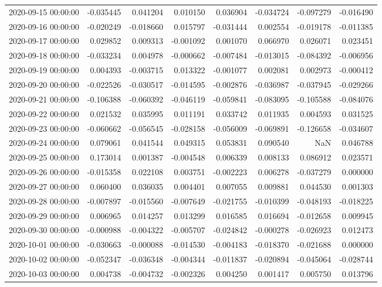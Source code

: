 \begin{tabular}{lrrrrrrr}
2020-09-15 00:00:00 & -0.035445 & 0.041204 & 0.010150 & 0.036904 & -0.034724 & -0.097279 & -0.016490 \\
2020-09-16 00:00:00 & -0.020249 & -0.018660 & 0.015797 & -0.031444 & 0.002554 & -0.019178 & -0.011385 \\
2020-09-17 00:00:00 & 0.029852 & 0.009313 & -0.001092 & 0.001070 & 0.066970 & 0.026071 & 0.023451 \\
2020-09-18 00:00:00 & -0.033234 & 0.004978 & -0.000662 & -0.007484 & -0.013015 & -0.084392 & -0.006956 \\
2020-09-19 00:00:00 & 0.004393 & -0.003715 & 0.013322 & -0.001077 & 0.002081 & 0.002973 & -0.000412 \\
2020-09-20 00:00:00 & -0.022526 & -0.030517 & -0.014595 & -0.002876 & -0.036987 & -0.037945 & -0.029266 \\
2020-09-21 00:00:00 & -0.106388 & -0.060392 & -0.046119 & -0.059841 & -0.083095 & -0.105588 & -0.084076 \\
2020-09-22 00:00:00 & 0.021532 & 0.035995 & 0.011191 & 0.033742 & 0.011935 & 0.004593 & 0.031525 \\
2020-09-23 00:00:00 & -0.060662 & -0.056545 & -0.028158 & -0.056009 & -0.069891 & -0.126658 & -0.034607 \\
2020-09-24 00:00:00 & 0.079061 & 0.041544 & 0.049315 & 0.053831 & 0.090540 & NaN & 0.046788 \\
2020-09-25 00:00:00 & 0.173014 & 0.001387 & -0.004548 & 0.006339 & 0.008133 & 0.086912 & 0.023571 \\
2020-09-26 00:00:00 & -0.015358 & 0.022108 & 0.003751 & -0.002223 & 0.006278 & -0.037279 & 0.000000 \\
2020-09-27 00:00:00 & 0.060400 & 0.036035 & 0.004401 & 0.007055 & 0.009881 & 0.044530 & 0.001303 \\
2020-09-28 00:00:00 & -0.007897 & -0.015560 & -0.007649 & -0.021755 & -0.010399 & -0.048193 & -0.018225 \\
2020-09-29 00:00:00 & 0.006965 & 0.014257 & 0.013299 & 0.016585 & 0.016694 & -0.012658 & 0.009945 \\
2020-09-30 00:00:00 & -0.000988 & -0.004322 & -0.005707 & -0.024842 & -0.000278 & -0.026923 & 0.012473 \\
2020-10-01 00:00:00 & -0.030663 & -0.000088 & -0.014530 & -0.004183 & -0.018370 & -0.021688 & 0.000000 \\
2020-10-02 00:00:00 & -0.052347 & -0.036348 & -0.004344 & -0.011837 & -0.020894 & -0.045064 & -0.028744 \\
2020-10-03 00:00:00 & 0.004738 & -0.004732 & -0.002326 & 0.004250 & 0.001417 & 0.005750 & 0.013796 \\

\end{tabular}
